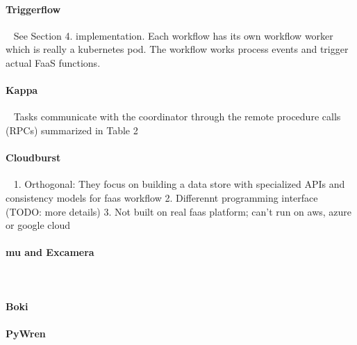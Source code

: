 \paragraph{Triggerflow}~\cite{triggerflow}
See Section 4. implementation. Each workflow has its own workflow worker which is really a kubernetes pod. The workflow works process events and trigger actual FaaS functions.


\paragraph{Kappa}~\cite{kappa}
Tasks communicate with the coordinator through
the remote procedure calls (RPCs) summarized in Table 2


\paragraph{Cloudburst}~\cite{cloudburst}
1. Orthogonal: They focus on building a data store with specialized APIs and consistency models for faas workflow
2. Differennt programming interface (TODO: more details)
3. Not built on real faas platform; can't run on aws, azure or google cloud


\paragraph{mu and Excamera}~\cite{excamera}

\paragraph{Boki}


\paragraph{PyWren}~\cite{pywren}






 



